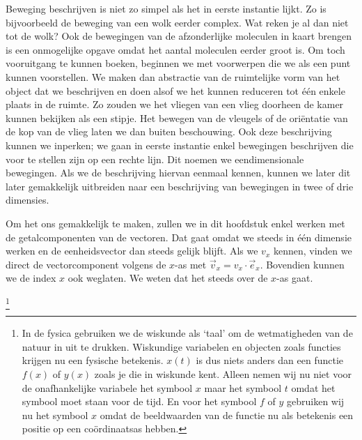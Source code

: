 \documentclass{ximera}
\begin{document}
	\author{Bart Lambregs}
    \xmsource\xmuitleg


	Beweging beschrijven is niet zo simpel als het in eerste instantie lijkt.
	Zo is bijvoorbeeld de beweging van een wolk eerder complex.
	Wat reken je al dan niet tot de wolk? Ook de bewegingen van de afzonderlijke moleculen in kaart brengen is een onmogelijke opgave omdat het aantal moleculen eerder groot is.
	Om toch vooruitgang te kunnen boeken, beginnen we met voorwerpen die we als een punt kunnen voorstellen.
	We maken dan abstractie van de ruimtelijke vorm van het object dat we beschrijven en doen alsof we het kunnen reduceren tot één enkele plaats in de ruimte.
	Zo zouden we het vliegen van een vlieg doorheen de kamer kunnen bekijken als een stipje.
	Het bewegen van de vleugels of de oriëntatie van de kop van de vlieg laten we dan buiten beschouwing.
	Ook deze beschrijving kunnen we inperken; we gaan in eerste instantie enkel bewegingen beschrijven die voor te stellen zijn op een rechte lijn.
	Dit noemen we eendimensionale bewegingen.
	Als we de beschrijving hiervan eenmaal kennen, kunnen we later dit later gemakkelijk uitbreiden naar een beschrijving van bewegingen in twee of drie dimensies.
	

	
	Om het ons gemakkelijk te maken, zullen we in dit hoofdstuk enkel werken met de getalcomponenten van de vectoren.
	Dat gaat omdat we steeds in één dimensie werken en de eenheidsvector dan steeds gelijk blijft.
	Als we $v_x$ kennen, vinden we direct de vectorcomponent volgens de $x$-as met $\vec{v}_x=v_x\cdot\vec{e}_x$.
	Bovendien kunnen we de index $x$ ook weglaten.
	We weten dat het steeds over de $x$-as gaat.
		
	
	\footnote{In de fysica gebruiken we de wiskunde als `taal' om de wetmatigheden van de natuur in uit te drukken.
	Wiskundige variabelen en objecten zoals functies krijgen nu een fysische betekenis.
	$x(t)$ is dus niets anders dan een functie $f(x)$ of $y(x)$ zoals je die in wiskunde kent.
	Alleen nemen wij nu niet voor de onafhankelijke variabele het symbool $x$ maar het symbool $t$ omdat het symbool moet staan voor de tijd.
	En voor het symbool $f$ of \(y\) gebruiken wij nu het symbool $x$ omdat de beeldwaarden van de functie nu als betekenis een positie op een coördinaatsas hebben.}
	
	
\end{document}
